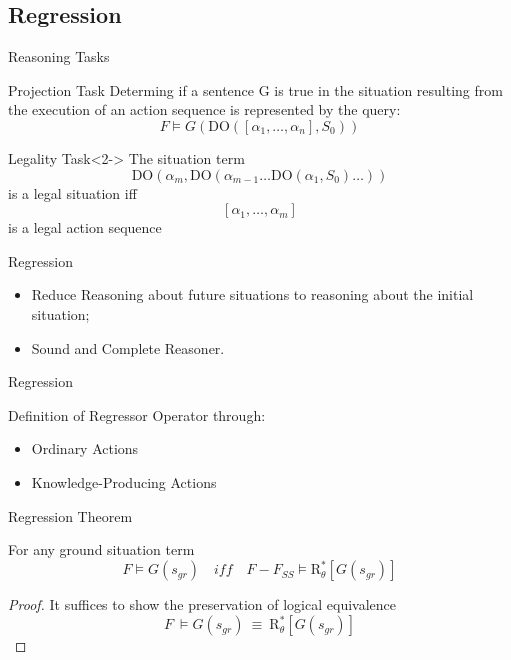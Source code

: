 \subsection{Regression}

\begin{frame}{Reasoning Tasks}
    
\begin{block}{Projection Task}
Determing if a sentence G is true in the situation resulting
from the execution of an action sequence is represented by the query:
    \[ \textit{F} \models \textit{G}(\text{DO}([\alpha_1, \ldots, \alpha_{n}], S_0)) \]
\end{block}

\begin{block}{Legality Task}<2->
The situation term
    \[ \text{DO}(\alpha_m, \text{DO}(\alpha_{m-1} \ldots \text{DO}(\alpha_1, S_0) \ldots)) \]
is a legal situation iff 
    \[ [\alpha_1, \ldots, \alpha_{m}] \]
is a legal action sequence        
    
\end{block}    

\end{frame}

\begin{frame}{Regression}
 
\begin{itemize}
   \item Reduce Reasoning about future situations to reasoning about the initial situation;
   \item Sound and Complete Reasoner.
\end{itemize}

\end{frame}

\begin{frame}{Regression}

Definition of Regressor Operator through:    

\begin{itemize}
  \item Ordinary Actions
  \item Knowledge-Producing Actions
\end{itemize}

\end{frame}       

\begin{frame}{Regression Theorem}
    \begin{theorem}
     For any ground situation term 
     \[ \textit{F} \models \textit{G}(s_{gr}) \quad iff \quad \textit{F} - \textit{F}_{\textit{SS}} \models \text{R}^*_{\theta}[\textit{G}(s_{gr})] \] 
    \end{theorem}
    \begin{proof}
     It suffices to show the preservation of logical equivalence
     \[ \textit{F} \ \models \textit{G}(s_{gr}) \ \equiv \ \text{R}^*_{\theta}[\textit{G}(s_{gr})] \]   
    \end{proof}        
\end{frame}     


